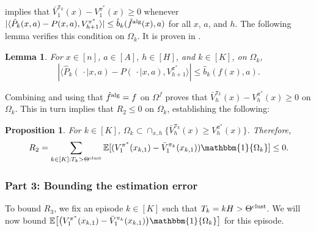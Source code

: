\documentclass[11pt]{article}
\newcommand{\mbb}[1]{\mathbbm{#1}}
\newcommand{\mbbE}{\mathbb{E}}
\newcommand{\clust}{\textnormal{clust}}
\newcommand{\alg}{\textnormal{alg}}
\newtheorem{lemma}[theorem]{Lemma}
\newtheorem{proposition}[theorem]{Proposition}
\theoremstyle{definition}
\theoremstyle{definition}
\begin{document}
 implies that $\bar{V}^{\pi_k}_1(x)- V^{\pi^*}_1(x)\geq0$ whenever $|\langle \hat{P}_k(x,a)-P(x,a), V^{\pi^*} _{h+1}\rangle| \leq \allowbreak \hat{b}_k(\hat{f}^{\alg}(x), a)$ for all $x$, $a$, and $h$.
The following lemma verifies this condition on $\Omega_k$.
It is proven in .

\begin{lemma}
	\label{lem:esterrorconfbd}
	For $x\in[n]$, $a\in[A]$, $h\in[H]$, and $k\in[K]$, on $\Omega_k$,
	\begin{equation}
		\label{eqn:estimation_error_confidence_bound}
		|
		\langle
		\hat{P}_k(\,\cdot\mid x,a)-P(\,\cdot\mid x,a),V^{\pi^*}_{h+1}
		\rangle
		|
		\leq
		\hat{b}_k(f(x),a)
		.
	\end{equation}
\end{lemma}

Combining  and using that $\hat{f}^{\alg}=f$ on $\Omega^f$ proves that $\bar{V}^{\pi_k}_h(x)-V^{\pi^*}_h(x)\geq 0$ on $\Omega_k$.
This in turn implies that $R_2\leq 0$ on $\Omega_k$, establishing the following:
\begin{proposition}
	\label{prop:optimism}
	For $k\in[K]$, $\Omega_k\subset \cap_{x,h}\{\bar{V}^{\pi_k}_h(x)\geq V^{\pi^*}_h(x)\}$.
	Therefore,
	\begin{equation}
		R_2
		=
		\sum_{k\in[K]:T_k>\Theta^{\clust}}\mbbE[(V^{\pi^*}_1(x_{k,1})-\bar{V}^{\pi_k}_1(x_{k,1}))\mathbbm{1}\{\Omega_k\}]
		\leq
		0
		.
	\end{equation}
\end{proposition}

\subsubsection*{Part 3: Bounding the estimation error}

To bound $R_3$, we fix an episode $k\in[K]$ such that $T_k=kH>\Theta^{\clust}$.
We will now bound $\mbbE\bigl[\bigl( V^{\pi^*}_1(x_{k,1})-\bar{V}^{\pi_k}_1(x_{k,1})\bigr) \mbb{1}\{\Omega_k\}\bigr]$ for this episode.
\end{document}
